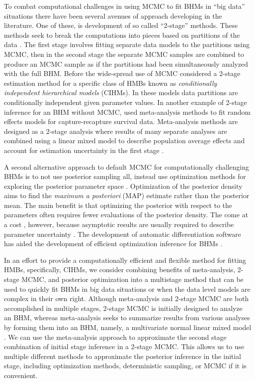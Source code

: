 \documentclass[12pt]{article}
\begin{document}
To combat computational challenges in using MCMC to fit BHMs in ``big data'' situations there have been several avenues of approach  developing in the literature. One of these, is development of so called ``2-stage'' methods. These methods seek to break the computations into pieces based on partitions of the data \citep{goudie2019joining, hooten2016hierarchical,hooten2018prior,lunn2013fully,mesquita2020embarrassingly}. The first stage involves fitting separate data models to the partitions using MCMC, then in the second stage the separate MCMC samples are combined to produce an MCMC sample as if the partitions had been simultaneously analyzed with the full BHM. Before the wide-spread use of MCMC \cite{kass1989approximate} considered a 2-stage estimation method for a specific class of HMBs known as {\it conditionally independent hierarchical models} (CIHMs). In these models data partitions are conditionally independent given parameter values. In another example of 2-stage inference for an BHM without MCMC, \citet{burnham2002evaluation} used meta-analysis methods to fit random effects models for capture-recapture survival data. Meta-analysis methods are designed as a 2-stage analysis where results of many separate analyses are combined using a linear mixed model to describe population average effects and account for estimation uncertainty in the first stage \citep{gasparrini2012multivariate,higgins2009re}. 

A second alternative approach to default MCMC for computationally challenging BHMs is to not use posterior sampling all, instead use  optimization methods for exploring the posterior parameter space \citep{green2015bayesian}. Optimization of the posterior density aims to find the  {\it maximum a posteriori} (MAP) estimate rather than the posterior mean. The main benefit is that optimizing the posterior with respect to the parameters often requires fewer evaluations of the posterior density. The come at a cost , however, because asymptotic results are usually required to describe parameter uncertainty \citep{van2000asymptotic}. The development of automatic differentiation software has aided the development of efficient optimization inference for BHMs \citep{kristensen2016tmb, skaug2006automatic}.

In an effort to provide a computationally efficient and flexible method for fitting HMBs, specifically, CIHMs, we consider combining benefits of meta-analysis, 2-stage MCMC, and posterior optimization into a multistage method that can be used to quickly fit BHMs in big data situations or when the data level models are complex in their own right. Although meta-analysis and 2-stage MCMC are both accomplished in multiple stages, 2-stage MCMC is initially designed to analyze an BHM, whereas meta-analysis seeks to summarize results from various analyses by forming them into an BHM, namely, a multivariate normal linear mixed model \citep{gasparrini2012multivariate}. We can use the meta-analysis approach to approximate the second stage combination of initial stage inference in a 2-stage MCMC. This allows us to use multiple different methods to approximate the posterior inference in the initial stage, including optimization methods, deterministic sampling, or MCMC if it is convenient. 
\end{document}
